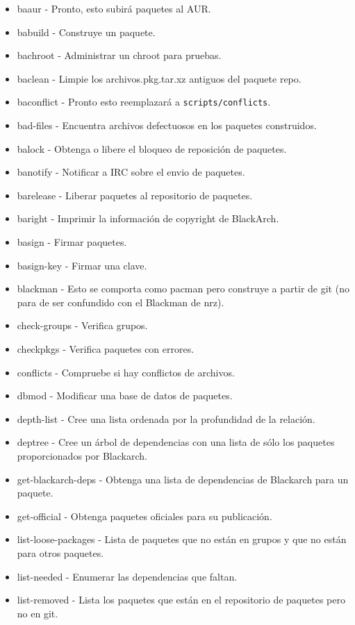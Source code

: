\documentclass[a4paper, oneside, 11pt]{book}
\begin{document}
\begin{itemize}
\item baaur -  Pronto, esto subir\'a paquetes al AUR.
\item babuild - Construye un paquete.
\item bachroot - Administrar un chroot para pruebas.
\item baclean - Limpie los archivos.pkg.tar.xz antiguos del paquete repo.
\item baconflict - Pronto esto reemplazará a \verb|scripts/conflicts|.
\item bad-files - Encuentra archivos defectuosos en los paquetes construidos.
\item balock - Obtenga o libere el bloqueo de reposici\'on de paquetes.
\item banotify - Notificar a IRC sobre el envio de paquetes.
\item barelease - Liberar paquetes al repositorio de paquetes.
\item baright - Imprimir la información de copyright de BlackArch.
\item basign -  Firmar paquetes.
\item basign-key - Firmar una clave.
\item blackman - Esto se comporta como pacman pero construye a partir de git (no para de ser
    confundido con el Blackman de nrz).
\item check-groups - Verifica grupos.
\item checkpkgs - Verifica paquetes con errores.
\item conflicts - Compruebe si hay conflictos de archivos.
\item dbmod - Modificar una base de datos de paquetes.
\item depth-list - Cree una lista ordenada por la profundidad de la relación.
\item deptree - Cree un árbol de dependencias con una lista de sólo los paquetes proporcionados por Blackarch.
\item get-blackarch-deps - Obtenga una lista de dependencias de Blackarch para un paquete.
\item get-official - Obtenga paquetes oficiales para su publicación.
\item list-loose-packages - Lista de paquetes que no est\'an en grupos y que no est\'an
    para otros paquetes.
\item list-needed - Enumerar las dependencias que faltan.
\item list-removed - Lista los paquetes que están en el repositorio de paquetes pero no en git.

\end{itemize}
\end{document}

